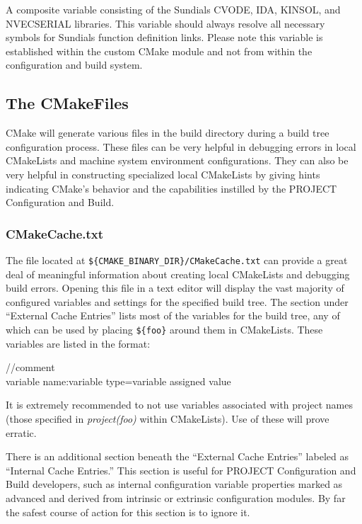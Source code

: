 \documentclass[12pt,letterpaper]{article}
\begin{document}
A composite variable consisting of the Sundials CVODE, IDA, KINSOL, and NVECSERIAL libraries.  This variable should always resolve all necessary symbols for Sundials function definition links.  Please note this variable is established within the custom CMake module and not from within the configuration and build system.

\subsection{The CMakeFiles}

CMake will generate various files in the build directory during a build tree configuration process.  These files can be very helpful in debugging errors in local CMakeLists and machine system environment configurations.  They can also be very helpful in constructing specialized local CMakeLists by giving hints indicating CMake's behavior and the capabilities instilled by the PROJECT Configuration and Build.

\subsubsection{CMakeCache.txt}

The file located at \verb|${CMAKE_BINARY_DIR}/CMakeCache.txt| can provide a great deal of meaningful information about creating local CMakeLists and debugging build errors.  Opening this file in a text editor will display the vast majority of configured variables and settings for the specified build tree.  The section under ``External Cache Entries'' lists most of the variables for the build tree, any of which can be used by placing \verb|${foo}| around them in CMakeLists.  These variables are listed in the format:

\begin{shaded}
\noindent//comment\\
variable name:variable type=variable assigned value
\end{shaded}

It is extremely recommended to not use variables associated with project names (those specified in \emph{project(foo)} within CMakeLists).  Use of these will prove erratic.

There is an additional section beneath the ``External Cache Entries'' labeled as ``Internal Cache Entries.''  This section is useful for PROJECT Configuration and Build developers, such as internal configuration variable properties marked as advanced and derived from intrinsic or extrinsic configuration modules.  By far the safest course of action for this section is to ignore it.
\end{document}
